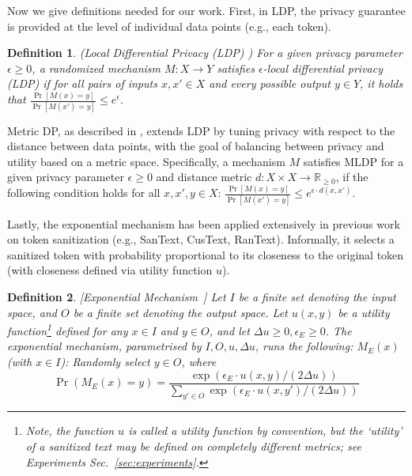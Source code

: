 \documentclass[11pt]{article}
\newtheorem{definition}{Definition}
\begin{document}
Now we give definitions needed for our work. First, in LDP, the privacy guarantee is provided at the level of individual data points (e.g., each token). %



\begin{definition}(Local Differential Privacy (LDP) \cite{duchi2013local})
For a given privacy parameter \(\epsilon \geq 0\), a randomized mechanism \(M : X \rightarrow Y\) satisfies \(\epsilon\)-local differential privacy (LDP) if for all pairs of inputs \(x, x' \in X\) and every possible output \(y \in Y\), it holds that
\(
\frac{\Pr[M(x) = y]}{\Pr[M(x') = y]} \leq e^{\epsilon}.
\)


\end{definition}


Metric DP, as described in \cite{alvim2018local}, extends LDP by tuning privacy with respect to the distance between data points, with the goal of balancing between privacy and utility based on a metric space. 
Specifically, a mechanism \(M\) satisfies MLDP for a given privacy parameter \(\epsilon \geq 0\) and distance metric \(d : X \times X \rightarrow \mathbb{R}_{\geq 0}\), if the following condition holds for all \(x, x', y \in X\):
$
\frac{\Pr[M(x) = y]}{\Pr[M(x') = y]} \leq e^{\epsilon \cdot d(x, x')}.
$

\smallskip
Lastly, the exponential mechanism has been applied extensively in previous work on token sanitization (e.g., SanText, CusText, RanText). Informally, it selects a sanitized token with probability proportional to its closeness to the original token (with closeness defined via utility function $u$).
\begin{definition}
\label{def:expmech}
[Exponential Mechanism~\cite{mcsherry2007mechanism}]
    Let $I$ be a finite set denoting the input space, and $O$ be a finite set denoting the output space. 
    Let $u(x, y)$ be a utility function\footnote{Note, the function $u$ is called a {\em utility function} by convention, but the `utility' of a sanitized text may be defined on completely different metrics; see Experiments Sec.~\ref{sec:experiments}.} defined for any $x\in I$ and $y\in O$, and let $\Delta u \geq 0, \epsilon_E\geq 0$. The exponential mechanism, parametrised by $I, O, u, \Delta u$, runs the following: 
    $M_E(x)$ (with $x\in I$):
        Randomly select $y\in O$, where
        {\small $$\Pr(M_E(x) = y) = \frac{ \exp(\epsilon_E\cdot u(x, y)/(2\Delta u))}{\sum_{y'\in O}\exp(\epsilon_E\cdot u(x, y')/(2\Delta u))}
        $$}
\end{definition}
\end{document}
